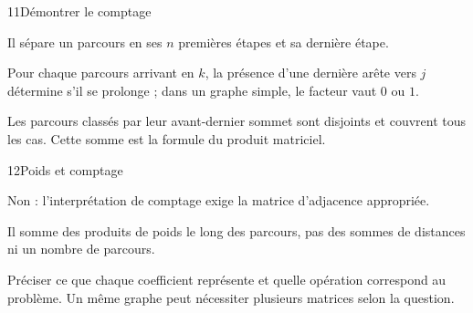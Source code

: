 \begin{corrige}{11}{Démontrer le comptage}
\begin{questions}
\item Il sépare un parcours en ses $n$ premières étapes et sa dernière étape.
\item Pour chaque parcours arrivant en $k$, la présence d’une dernière arête vers $j$ détermine s’il se prolonge ; dans un graphe simple, le facteur vaut $0$ ou $1$.
\item Les parcours classés par leur avant-dernier sommet sont disjoints et couvrent tous les cas. Cette somme est la formule du produit matriciel.
\end{questions}
\end{corrige}
\begin{corrige}{12}{Poids et comptage}
\begin{questions}
\item Non : l’interprétation de comptage exige la matrice d’adjacence appropriée.
\item Il somme des produits de poids le long des parcours, pas des sommes de distances ni un nombre de parcours.
\item Préciser ce que chaque coefficient représente et quelle opération correspond au problème. Un même graphe peut nécessiter plusieurs matrices selon la question.
\end{questions}
\end{corrige}
